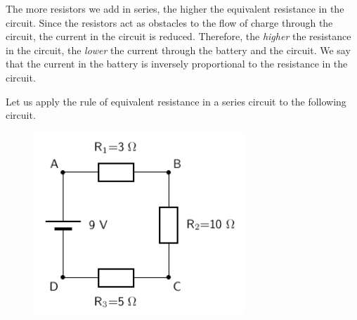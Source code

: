           \label{m38776*id64719}The more resistors we add in series, the higher the equivalent resistance in the circuit. Since the resistors act as obstacles to the flow of charge through the circuit, the current in the circuit is reduced. Therefore, the \textsl{higher} the resistance in the circuit, the \textsl{lower} the current through the battery and the circuit. We say that the current in the battery is inversely proportional to the resistance in the circuit. 

Let us apply the rule of equivalent resistance in a series circuit to the following circuit.\par 
          \label{m38776*id64722}
            
    \setcounter{subfigure}{0}


	\begin{figure}[H] %
    \begin{center}
    \label{m38776*id64726!!!underscore!!!media}\label{m38776*id64726!!!underscore!!!printimage}\includegraphics[width=300px]{col11305.imgs/m38776_PG11C9_008.png} %
        
      \vspace{2pt}
    \vspace{.1in}
    
    \end{center}

 \end{figure}   

    \addtocounter{footnote}{-0}
    
